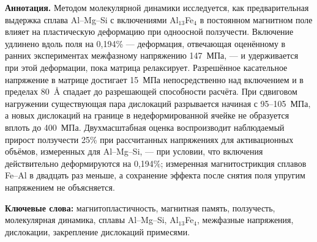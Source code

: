 \noindent\textbf{Аннотация.}
Методом молекулярной динамики исследуется, как предварительная выдержка
сплава Al--Mg--Si с включениями Al$_{13}$Fe$_4$ в постоянном магнитном поле
влияет на пластическую деформацию при одноосной ползучести. Включение
удлинено вдоль поля на 0{,}194\% --- деформация, отвечающая оценённому в
ранних экспериментах межфазному напряжению 147~МПа, --- и удерживается при
этой деформации, пока матрица релаксирует. Разрешённое касательное
напряжение в матрице достигает 15~МПа непосредственно над включением и в
пределах 80~\AA{} спадает до разрешающей способности расчёта. При сдвиговом
нагружении существующая пара дислокаций разрывается начиная с 95--105~МПа, а
новых дислокаций на границе в недеформированной ячейке не образуется вплоть
до 400~МПа. Двухмасштабная оценка воспроизводит наблюдаемый прирост
ползучести 25\% при рассчитанных напряжениях для активационных объёмов,
измеренных для Al--Mg--Si, --- при условии, что включения действительно
деформируются на 0{,}194\%; измеренная магнитострикция сплавов Fe--Al в
двадцать раз меньше, а сохранение эффекта после снятия поля упругим
напряжением не объясняется.

\noindent\textbf{Ключевые слова:} магнитопластичность, магнитная память,
ползучесть, молекулярная динамика, сплавы Al--Mg--Si, Al$_{13}$Fe$_4$,
межфазные напряжения, дислокации, закрепление дислокаций примесями.